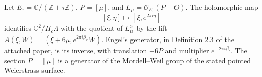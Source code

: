 \begin{proposition}\hypertarget{tag-01Q7}{}\label{fam:src:B.1.1}\label{fam:st:B.1.1}

Let $E_\tau=\mathbb C/(\mathbb Z+\tau\mathbb Z)$, $P=[\mu]$, and $L_\mu=\mathcal O_{E_\tau}(P-O)$. The holomorphic map
\[
 [\xi,\eta]\longmapsto[\xi,e^{2\pi i\eta}]
\]
identifies $\mathbb C^2/\Pi_c\Lambda$ with the quotient of $L_\mu^\times$ by the lift
$A(\xi,W)=(\xi+6\mu,e^{2\pi i\beta_c}W)$. Engel's generator, in Definition 2.3 of the attached paper, is its inverse, with translation $-6P$ and multiplier $e^{-2\pi i\beta_c}$. The section $P=[\mu]$ is a generator of the Mordell--Weil group of the stated pointed Weierstrass surface.
\end{proposition}


